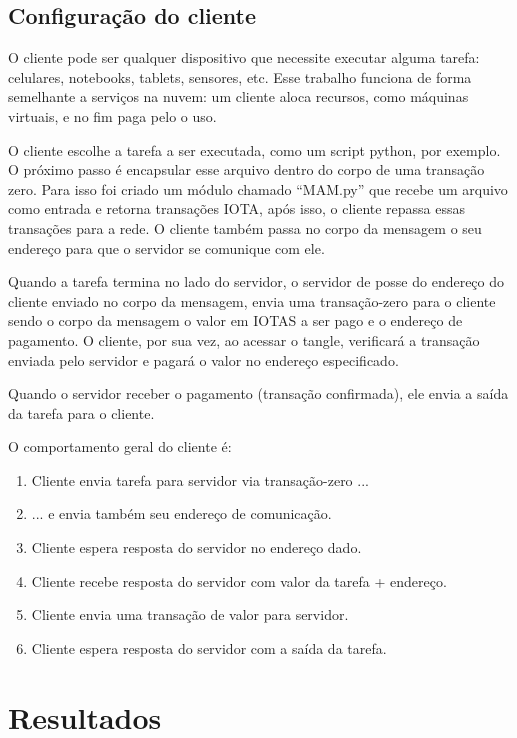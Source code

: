 \documentclass[a4paper]{article}
\begin{document}
\subsection{Configuração do cliente}

O cliente pode ser qualquer dispositivo que necessite executar alguma tarefa: celulares, notebooks, tablets, sensores, etc.
Esse trabalho funciona de forma semelhante a serviços na nuvem: um cliente aloca recursos, como máquinas virtuais, e no fim
paga pelo o uso.

O cliente escolhe a tarefa a ser executada, como um script python, por exemplo. O próximo passo é encapsular esse arquivo dentro
do corpo de uma transação zero. Para isso foi criado um módulo chamado ``MAM.py'' que recebe um arquivo como entrada e retorna
transações IOTA, após isso, o cliente repassa essas transações para a rede. O cliente também passa no corpo da mensagem o
seu endereço para que o servidor se comunique com ele.

Quando a tarefa termina no lado do servidor, o servidor de posse do endereço do cliente enviado no corpo da mensagem, envia uma
transação-zero para o cliente sendo o corpo da mensagem o valor em IOTAS a ser pago e o endereço de pagamento. O cliente, por sua vez,
ao acessar o tangle, verificará a transação enviada pelo servidor e pagará o valor no endereço especificado.

Quando o servidor receber o pagamento (transação confirmada), ele envia a saída da tarefa para o cliente.

O comportamento geral do cliente é:

\begin{enumerate}
\item Cliente envia tarefa para servidor via transação-zero ...
\item ... e envia também seu endereço de comunicação.
\item Cliente espera resposta do servidor no endereço dado.
\item Cliente recebe resposta do servidor com valor da tarefa  + endereço.
\item Cliente envia uma transação de valor para servidor.
\item Cliente espera resposta do servidor com a saída da tarefa.
\end{enumerate}

\section{Resultados}\label{sec:Output}
\end{document}
